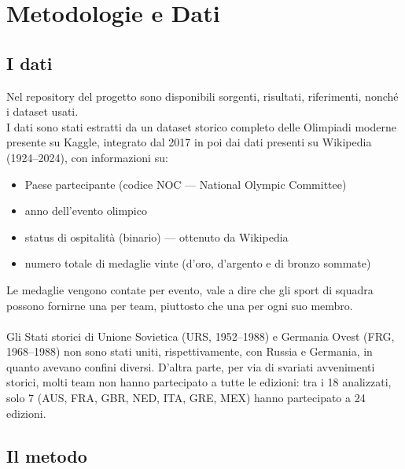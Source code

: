 \section{Metodologie e Dati}\label{sec:methods}

\subsection{I dati}
Nel repository del progetto\cite{our-repo} sono disponibili sorgenti, risultati,
riferimenti, nonché i dataset usati.\\
I dati sono stati estratti da un dataset storico completo delle Olimpiadi
moderne presente su Kaggle\cite{120YearsOlympic}, integrato dal 2017 in poi dai
dati presenti su
Wikipedia\cite{WikipediaOlympics,WikipediaW2018,WikipediaS2020,WikipediaW2022,WikipediaS2024,WikipediaW2026}
(1924--2024), con informazioni su:
\begin{itemize}
	\item Paese partecipante (codice NOC --- National Olympic Committee)
	\item anno dell'evento olimpico
	\item status di ospitalità (binario) --- ottenuto da Wikipedia
	\item numero totale di medaglie vinte (d'oro, d'argento e di bronzo sommate)
\end{itemize}
Le medaglie vengono contate per evento, vale a dire che gli sport di squadra
possono fornirne una per team, piuttosto che una per ogni suo membro.\\
\\
Gli Stati storici di Unione Sovietica (URS, 1952--1988) e Germania Ovest (FRG,
1968--1988) non sono stati uniti, rispettivamente, con Russia e Germania, in
quanto avevano confini diversi. D'altra parte, per via di svariati avvenimenti
storici, molti team non hanno partecipato a tutte le edizioni: tra i 18
analizzati, solo 7 (AUS, FRA, GBR, NED, ITA, GRE, MEX) hanno partecipato a 24
edizioni.\\


\subsection{Il metodo}


